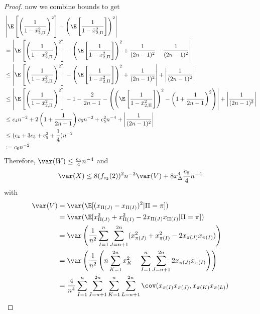 \begin{proof}
  now we combine bounds to get
  \begin{align*}
    &\left | \E \left [ \left (\frac{1}{1-\bar{x}_{2,\Pi}^2} \right )^2 \right ] -
      \left ( \E \left [ \frac{1}{1-\bar{x}_{2,\Pi}^2} \right ] \right )^2 \right | \\
    &= \left | \E \left [ \left (\frac{1}{1-\bar{x}_{2,\Pi}^2} \right )^2 \right ] -
      \left ( \E \left [ \frac{1}{1-\bar{x}_{2,\Pi}^2} \right ] \right )^2
    + \frac{1}{(2n-1)^2} - \frac{1}{(2n-1)^2} \right | \\
  &\leq \left | \E \left [ \left (\frac{1}{1-\bar{x}_{2,\Pi}^2} \right )^2 \right ] -
      \left ( \E \left [ \frac{1}{1-\bar{x}_{2,\Pi}^2} \right ] \right )^2
      + \frac{1}{(2n-1)^2} \right | + \left | \frac{1}{(2n-1)^2} \right |\\
    &\leq \left |
      \E \left [ \left (\frac{1}{1-\bar{x}_{2,\Pi}^2} \right )^2 \right ]
      - 1 - \frac{2}{2n-1} -
      \left (
        \left ( \E \left [ \frac{1}{1-\bar{x}_{2,\Pi}^2} \right ] \right )^2
        - \left ( 1 + \frac{1}{2n-1} \right )^2
      \right ) \right | + \left | \frac{1}{(2n-1)^2} \right | \\
    &\leq c_4 n^{-2}
    + 2 \left ( 1 + \frac{1}{2n-1} \right ) c_5 n^{-2} + c_5^2 n^{-4}
    + \left | \frac{1}{(2n-1)^2} \right | \\
    &\leq (c_4 + 3c_5 + c_5^2 + \frac{1}{4}) n^{-2} \\
    &:= c_6 n^{-2}
  \end{align*}
  Therefore, $\var(W) \leq \frac{c_6}{4}n^{-4}$ and
  \begin{equation*}
    \var(X) \leq 8(f_{c_2}(2))^2 n^{-2} \var(V) + 8x_{\Delta}^4 \frac{c_6}{4} n^{-4}
  \end{equation*}
  with
  \begin{align*}
    \var(V) &= \var (\E[(x_{\Pi(J)}-x_{\Pi(I)})^2 | \Pi = \pi]) \\
    &= \var(\E[x_{\Pi(J)}^2+x_{\Pi(I)}^2-2x_{\Pi(J)}x_{\Pi(I)}| \Pi = \pi]) \\
    &= \var \left ( \frac{1}{n^2} \sum_{I=1}^{n}\sum_{J=n+1}^{2n}
    (x_{\pi(J)}^2+x_{\pi(I)}^2-2x_{\pi(J)}x_{\pi(I)}) \right ) \\
    &= \var \left ( \frac{1}{n^2} \left ( n \sum_{K=1}^{2n}x_K^2 -
      \sum_{I=1}^{n}\sum_{J=n+1}^{2n}2x_{\pi(J)}x_{\pi(I)} \right ) \right ) \\
    &= \frac{4}{n^4}
    \sum_{I=1}^{n}\sum_{J=n+1}^{2n}\sum_{K=1}^{n}\sum_{L=n+1}^{2n}
    \cov(x_{\pi(I)}x_{\pi(J)},x_{\pi(K)}x_{\pi(L)})
  \end{align*}

\end{proof}
